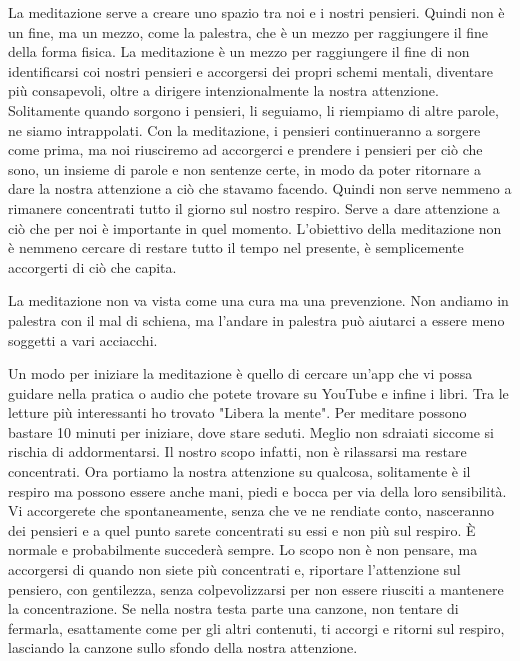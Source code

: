 \documentclass[12pt]{book} %
\begin{document}
La meditazione serve a creare uno spazio tra noi e i nostri pensieri. 
Quindi non è un fine, ma un mezzo, come la palestra, che è un mezzo per raggiungere il fine della forma fisica. La meditazione
è un mezzo per raggiungere il fine di non identificarsi coi nostri pensieri e accorgersi dei propri schemi mentali,
diventare più consapevoli, oltre a dirigere intenzionalmente la nostra attenzione. Solitamente quando sorgono i
pensieri, li seguiamo, li riempiamo di altre parole, ne siamo intrappolati. Con la
meditazione, i pensieri continueranno a sorgere come prima, ma noi riusciremo ad accorgerci e prendere i pensieri per
ciò che sono, un insieme di parole e non sentenze certe, in modo da poter ritornare a dare la nostra attenzione a ciò che
stavamo facendo. Quindi non serve nemmeno a rimanere concentrati tutto il giorno sul nostro respiro. 
Serve a dare attenzione a ciò che per noi è importante in quel momento. L'obiettivo della meditazione non è
nemmeno cercare di restare tutto il tempo nel presente, è semplicemente accorgerti di ciò che capita.

La meditazione non va vista come una cura ma una prevenzione. Non andiamo in palestra con il mal di schiena, ma l'andare in palestra può aiutarci a essere meno soggetti a vari acciacchi.

Un modo per iniziare la meditazione è quello di cercare un'app che vi possa guidare nella pratica o audio che potete trovare su YouTube e infine i libri. Tra le letture più interessanti ho trovato "Libera la mente". 
Per meditare possono bastare 10 minuti per iniziare, dove stare seduti. Meglio non sdraiati siccome si rischia di addormentarsi.
Il nostro scopo infatti, non è rilassarsi ma restare concentrati. Ora portiamo la nostra attenzione su qualcosa, solitamente è il respiro ma possono essere anche mani, piedi e bocca per via della loro sensibilità. 
Vi accorgerete che spontaneamente, senza che ve ne rendiate conto, nasceranno dei pensieri e a quel punto
sarete concentrati su essi e non più sul respiro. È normale e probabilmente succederà sempre. Lo
scopo non è non pensare, ma accorgersi di quando non siete più concentrati e, riportare l'attenzione sul pensiero, con gentilezza, senza colpevolizzarsi per non essere riusciti a mantenere la concentrazione. Se nella nostra testa parte una canzone, non tentare di fermarla, esattamente come per gli altri contenuti, ti accorgi e ritorni sul respiro, lasciando la canzone sullo sfondo della nostra attenzione.
\end{document}
